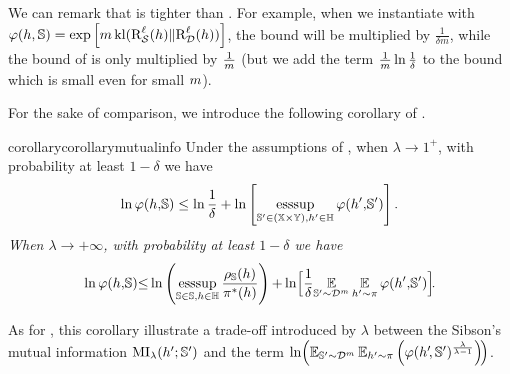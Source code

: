 \begin{noaddcontents}
We can remark that  is tighter than . 
For example, when we instantiate  with $\varphi(h,\mathbb{S})=\exp\left[ m\operatorname{kl}(\text{R}^{\ell}_{\mathcal{S}}(h)\|\text{R}^{\ell}_{\mathcal{D}}(h))\right]$, the bound will be multiplied by $\frac{1}{\delta m}$, while the bound of  is only multiplied by $\frac{1}{m}$ (but we add the term $\frac{1}{m}\ln\frac{1}{\delta}$ to the bound which is small even for small $m$).

For the sake of comparison, we introduce the following corollary of .

\begin{restatable}{corollary}{corollarymutualinfo}\label{chap:dis-pra:corollary:mutual-info} Under the assumptions of  , when $\lambda{\to}1^+$,  with probability at least $1{-}\delta$ we have
\begin{align*}
\ln\varphi(h{,}\mathbb{S}) \le \ln\frac{1}{\delta} + \ln\left[\operatorname*{\text{\rm esssup}}_{\mathbb{S}'\in(\mathbb{X}{\times}\mathbb{Y}), h'\in\mathbb{H}}\varphi(h'{,} \mathbb{S}')\right].
\end{align*}
\textit{When $\lambda{\to}+\infty$, with probability at least $1{-}\delta$ we have}
\begin{align*}
\ln\varphi(h{,} \mathbb{S}){\le}\ln\left(\operatorname*{\text{\rm esssup}}_{\mathbb{S}\in\mathbb{S}, h\in\mathbb{H}}\frac{\rho_{\mathbb{S}}(h)}{\pi^*(h)}\right){+}\ln\!\Big[\frac{1}{\delta} {\displaystyle \operatorname*{\mathbb{E}}_{\mathbb{S}'{\sim}\mathcal{D}^{m}}\operatorname*{\mathbb{E}}_{h'{\sim}\pi}\varphi(h'{,}\mathbb{S}')}\Big]\!.  
\end{align*}
\end{restatable}
As for , this corollary illustrate a trade-off introduced by $\lambda$ between the Sibson's mutual information $\operatorname{MI}_{\lambda}(h'; \mathbb{S}')$ and the term $\ln\!\left(\operatorname*{\mathbb{E}}_{\mathbb{S}'{\sim}\mathcal{D}^{m}}\operatorname*{\mathbb{E}}_{h'{\sim} \pi}\left(\varphi(h'\!, \mathbb{S}')^{\frac{\lambda}{\lambda-1}}\right)\!\right)$.\\


\end{noaddcontents}
